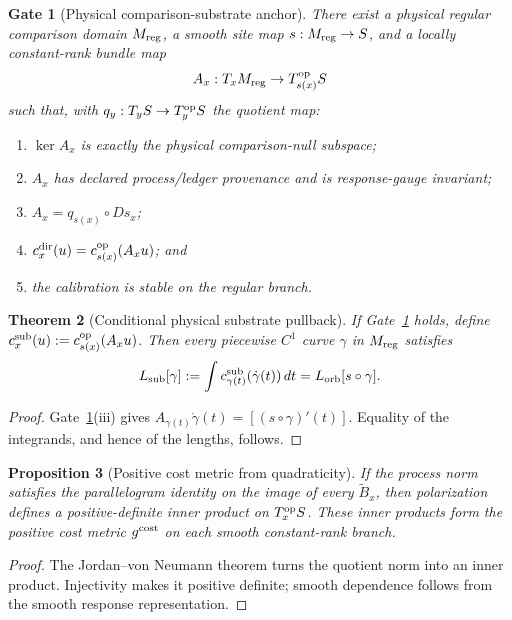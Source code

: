 \documentclass[11pt]{article}
\newtheorem{theorem}{Theorem}[section]
\newtheorem{proposition}[theorem]{Proposition}
\newtheorem{gate}[theorem]{Gate}
\theoremstyle{remark}
\begin{document}
\begin{gate}[Physical comparison-substrate anchor]
\label{gate:physical-substrate-anchor}
There exist a physical regular comparison domain $M_{\rm reg}$, a smooth site
map $s:M_{\rm reg}\to S$, and a locally constant-rank bundle map
\[
A_x:T_xM_{\rm reg}\to T_{s(x)}^{\rm op}S
\]
such that, with $q_y:T_yS\to T_y^{\rm op}S$ the quotient map:
\begin{enumerate}[label=(\roman*)]
\item $\ker A_x$ is exactly the physical comparison-null subspace;
\item $A_x$ has declared process/ledger provenance and is response-gauge
invariant;
\item $A_x=q_{s(x)}\circ Ds_x$;
\item $c_x^{\rm dir}(u)=c_{s(x)}^{\rm op}(A_xu)$; and
\item the calibration is stable on the regular branch.
\end{enumerate}
\end{gate}

\begin{theorem}[Conditional physical substrate pullback]
\label{thm:anchored-cost-geometry}
If Gate~\ref{gate:physical-substrate-anchor} holds, define
$c_x^{\rm sub}(u):=c_{s(x)}^{\rm op}(A_xu)$.  Then every piecewise $C^1$ curve
$\gamma$ in $M_{\rm reg}$ satisfies
\[
L_{\rm sub}[\gamma]
:=\int c^{\rm sub}_{\gamma(t)}(\dot\gamma(t))\,dt
=L_{\rm orb}[s\circ\gamma].
\]
\end{theorem}
\begin{proof}
Gate~\ref{gate:physical-substrate-anchor}(iii) gives
$A_{\gamma(t)}\dot\gamma(t)=[(s\circ\gamma)'(t)]$.  Equality of the integrands,
and hence of the lengths, follows.
\end{proof}

\begin{proposition}[Positive cost metric from quadraticity]
\label{prop:positive-cost-metric}
If the process norm satisfies the parallelogram identity on the image of every
$\widetilde B_x$, then polarization defines a positive-definite inner product
on $T_x^{\rm op}S$.  These inner products form the positive cost metric
$g^{\rm cost}$ on each smooth constant-rank branch.
\end{proposition}

\begin{proof}
The Jordan--von Neumann theorem turns the quotient norm into an inner product.
Injectivity makes it positive definite; smooth dependence follows from the
smooth response representation.
\end{proof}
\end{document}
